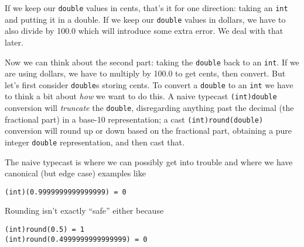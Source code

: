 \documentclass[11pt, oneside]{amsart}   	%
\begin{document}
If we keep our \texttt{double} values in cents, that's it for one direction: taking an \texttt{int} and putting it in a double. If we keep our \texttt{double} values in dollars, we have to also divide by 100.0 which will introduce some extra error. We deal with that later. 

Now we can think about the second part: taking the \texttt{double} back to an \texttt{int}. If we are using dollars, we have to multiply by 100.0 to get cents, then convert. But let's first consider \texttt{double}s storing cents. To convert a \texttt{double} to an \texttt{int} we have to think a bit about {\em how} we want to do this. A naive typecast \texttt{(int)double} conversion will {\em truncate} the \texttt{double}, disregarding anything past the decimal (the fractional part) in a base-10 representation; a cast \texttt{(int)round(double)} conversion will round up or down based on the fractional part, obtaining a pure integer \texttt{double} representation, and then cast that. 

The naive typecast is where we can possibly get into trouble and where we have canonical (but edge case) examples like 

\begin{verbatim}
(int)(0.9999999999999999) = 0
\end{verbatim}

Rounding isn't exactly ``safe'' either because 

\begin{verbatim}
(int)round(0.5) = 1
(int)round(0.4999999999999999) = 0
\end{verbatim}
\end{document}
